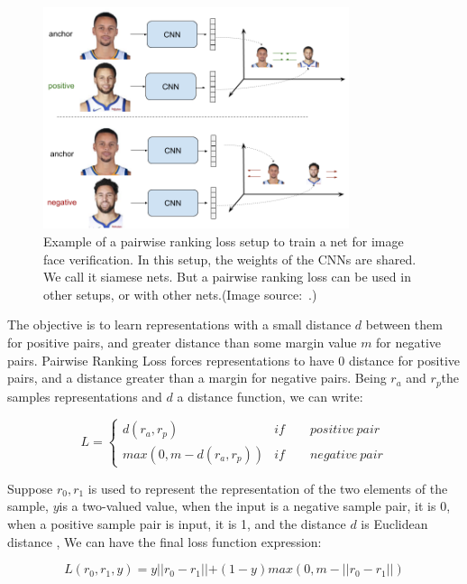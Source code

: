 \begin{figure}[!htbp]
	\centering
	\includegraphics[width = 0.8\textwidth]{figures/pairwise_ranking_loss_faces.png}
	\caption[Example of a pairwise ranking loss ]
	{ Example of a pairwise ranking loss setup to train a net for image face verification. In this setup, the weights of the CNNs are shared. We call it siamese nets. But a pairwise ranking loss can be used in other setups, or with other nets.(Image source:~\cite{triplet_loss_em}.)}
	\label{fig:pairwise_ranking_loss}
\end{figure}


The objective is to learn representations with a small distance $d$ between them for positive pairs, and greater distance than some margin value $m$ for negative pairs. Pairwise Ranking Loss forces representations to have $0$ distance for positive pairs, and a distance greater than a margin for negative pairs. Being $r_a$ and $r_p$the samples representations and $d$ a distance function, we can write:

\begin{equation}
L=\begin{cases}
	d(r_a,r_p) & if \qquad positive\ pair \\
	max(0,m-d(r_a,r_p)) & if \qquad negative\  pair
\end{cases}
\end{equation}

Suppose $r_0,r_1 $ is used to represent the representation of the two elements of the sample, $y$is a two-valued value, when the input is a negative sample pair, it is 0, when a positive sample pair is input, it is 1, and the distance $d$ is Euclidean distance , We can have the final loss function expression:

\begin{equation}
L(r_0,r_1,y)=y\left || r_0-r_1 \right || + (1-y)max(0,m-\left || r_0-r_1 \right ||)
\end{equation}

